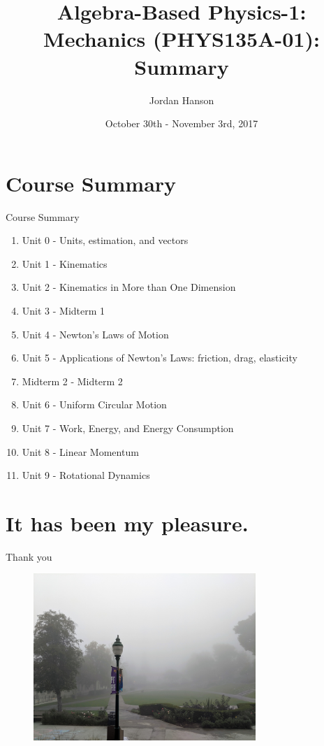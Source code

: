 \documentclass{beamer}
\title{Algebra-Based Physics-1: Mechanics (PHYS135A-01): Summary}
\date{October 30th - November 3rd, 2017}
\author{Jordan Hanson}
\institute{Whittier College Department of Physics and Astronomy}
\begin{document}
\maketitle

\section{Course Summary}

\begin{frame}{Course Summary}
\begin{enumerate}
\item Unit 0 - Units, estimation, and vectors
\item Unit 1 - Kinematics
\item Unit 2 - Kinematics in More than One Dimension
\item Unit 3 - Midterm 1
\item Unit 4 - Newton's Laws of Motion
\item Unit 5 - Applications of Newton's Laws: friction, drag, elasticity
\item Midterm 2 - Midterm 2
\item Unit 6 - Uniform Circular Motion
\item Unit 7 - Work, Energy, and Energy Consumption
\item Unit 8 - Linear Momentum
\item Unit 9 - Rotational Dynamics
\end{enumerate}
\end{frame}

\section{It has been my pleasure.}

\begin{frame}{Thank you}
\begin{figure}
\centering
\includegraphics[width=0.75\textwidth]{IMG_20191112_074409.jpg}
\end{figure}
\end{frame}
\end{document}
